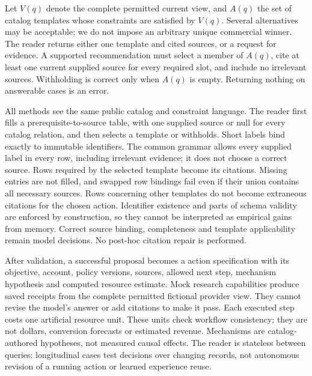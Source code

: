 Let $V(q)$ denote the complete permitted current view, and $A(q)$ the set of catalog templates whose constraints are satisfied by $V(q)$. Several alternatives may be acceptable; we do not impose an arbitrary unique commercial winner. The reader returns either one template and cited sources, or a request for evidence. A supported recommendation must select a member of $A(q)$, cite at least one current supplied source for every required slot, and include no irrelevant sources. Withholding is correct only when $A(q)$ is empty. Returning nothing on answerable cases is an error.

All methods see the same public catalog and constraint language. The reader first fills a prerequisite-to-source table, with one supplied source or null for every catalog relation, and then selects a template or withholds. Short labels bind exactly to immutable identifiers. The common grammar allows every supplied label in every row, including irrelevant evidence; it does not choose a correct source. Rows required by the selected template become its citations. Missing entries are not filled, and swapped row bindings fail even if their union contains all necessary sources. Rows concerning other templates do not become extraneous citations for the chosen action. Identifier existence and parts of schema validity are enforced by construction, so they cannot be interpreted as empirical gains from memory. Correct source binding, completeness and template applicability remain model decisions. No post-hoc citation repair is performed.

After validation, a successful proposal becomes a action specification with its objective, account, policy versions, sources, allowed next step, mechanism hypothesis and computed resource estimate. Mock research capabilities produce saved receipts from the complete permitted fictional provider view. They cannot revise the model's answer or add citations to make it pass. Each executed step costs one artificial resource unit. These units check workflow consistency; they are not dollars, conversion forecasts or estimated revenue. Mechanisms are catalog-authored hypotheses, not measured causal effects. The reader is stateless between queries: longitudinal cases test decisions over changing records, not autonomous revision of a running action or learned experience reuse.
